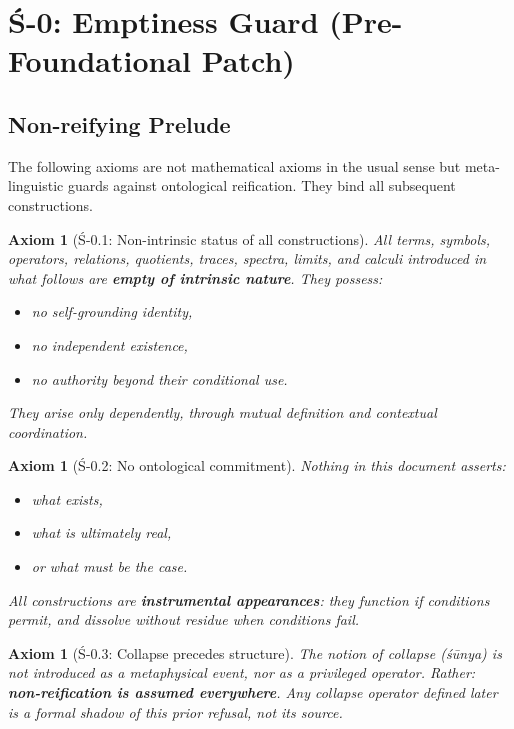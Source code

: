 \documentclass[12pt, oneside]{article}
\newtheorem{axiom}[theorem]{Axiom}
\begin{document}
\newpage

\section{Ś-0: Emptiness Guard (Pre-Foundational Patch)}

\subsection{Non-reifying Prelude}

The following axioms are not mathematical axioms in the usual sense but meta-linguistic guards against ontological reification. They bind all subsequent constructions.

\begin{axiom}[Ś-0.1: Non-intrinsic status of all constructions]
All terms, symbols, operators, relations, quotients, traces, spectra, limits, and calculi introduced in what follows are \textbf{empty of intrinsic nature}. They possess:
\begin{itemize}
    \item no self-grounding identity,
    \item no independent existence,
    \item no authority beyond their conditional use.
\end{itemize}
They arise only dependently, through mutual definition and contextual coordination.
\end{axiom}

\begin{axiom}[Ś-0.2: No ontological commitment]
Nothing in this document asserts:
\begin{itemize}
    \item what \textit{exists},
    \item what is \textit{ultimately real},
    \item or what \textit{must be the case}.
\end{itemize}
All constructions are \textbf{instrumental appearances}: they function if conditions permit, and dissolve without residue when conditions fail.
\end{axiom}

\begin{axiom}[Ś-0.3: Collapse precedes structure]
The notion of \textit{collapse} (śūnya) is not introduced as a metaphysical event, nor as a privileged operator. Rather: \textbf{non-reification is assumed everywhere}. Any collapse operator defined later is a formal shadow of this prior refusal, not its source.
\end{axiom}
\end{document}
